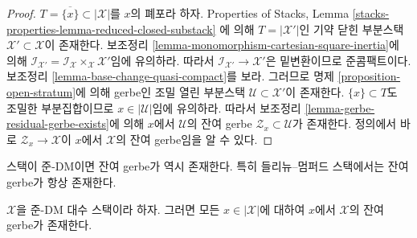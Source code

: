 \begin{proof}
$T = \overline{\{x\}} \subset |\mathcal{X}|$를 $x$의 폐포라 하자.
Properties of Stacks, Lemma
\ref{stacks-properties-lemma-reduced-closed-substack}
에 의해 $T = |\mathcal{X}'|$인 기약 닫힌 부분스택
$\mathcal{X}' \subset \mathcal{X}$이 존재한다. 보조정리
\ref{lemma-monomorphism-cartesian-square-inertia}에 의해
$\mathcal{I}_{\mathcal{X}'} =
\mathcal{I}_\mathcal{X} \times_\mathcal{X} \mathcal{X}'$임에 유의하라.
따라서 $\mathcal{I}_{\mathcal{X}'} \to \mathcal{X}'$은 밑변환이므로
준콤팩트이다. 보조정리 \ref{lemma-base-change-quasi-compact}를 보라.
그러므로 명제 \ref{proposition-open-stratum}에 의해 gerbe인 조밀 열린
부분스택 $\mathcal{U} \subset \mathcal{X}'$이 존재한다.
$\{x\} \subset T$도 조밀한 부분집합이므로 $x \in |\mathcal{U}|$임에
유의하라. 따라서 보조정리 \ref{lemma-gerbe-residual-gerbe-exists}에 의해
$x$에서 $\mathcal{U}$의 잔여 gerbe
$\mathcal{Z}_x \subset \mathcal{U}$가 존재한다. 정의에서 바로
$\mathcal{Z}_x \to \mathcal{X}$이 $x$에서 $\mathcal{X}$의 잔여
gerbe임을 알 수 있다.
\end{proof}

\noindent
스택이 준-DM이면 잔여 gerbe가 역시 존재한다. 특히 들리뉴–멈퍼드
스택에서는 잔여 gerbe가 항상 존재한다.

\begin{lemma}
\label{lemma-every-point-residual-gerbe-quasi-DM}
$\mathcal{X}$을 준-DM 대수 스택이라 하자. 그러면 모든
$x \in |\mathcal{X}|$에 대하여 $x$에서 $\mathcal{X}$의 잔여 gerbe가
존재한다.
\end{lemma}

